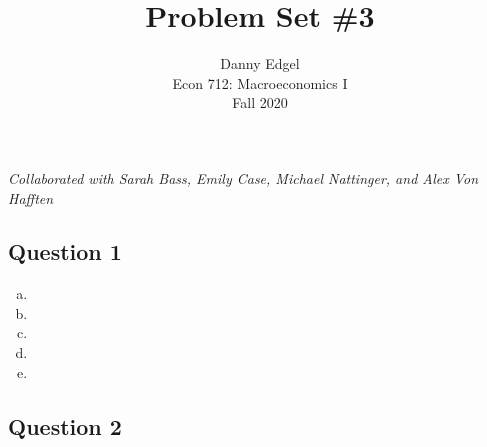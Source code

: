 \documentclass{article}
\begin{document}
\title{	Problem Set \#3 }
\author{ 	Danny Edgel 					\\ 
			Econ 712: Macroeconomics I		\\
			Fall 2020						\\
		}
\maketitle\thispagestyle{empty}


\noindent\textit{Collaborated with Sarah Bass, Emily Case, Michael Nattinger, and Alex Von Hafften}

\subsection*{Question 1}

\begin{enumerate}[(a)]
	\item 
	
	\item 
	
	
	\item 
	
	
	\item 
	
	
	\item 
	
	
\end{enumerate}

\subsection*{Question 2}
\end{document}
